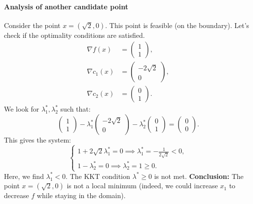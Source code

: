 \paragraph{Analysis of another candidate point}
Consider the point $x = (\sqrt{2}, 0)$. This point is feasible (on the boundary).
Let's check if the optimality conditions are satisfied.
\begin{align*}
    \nabla f(x) &= \begin{pmatrix} 1 \\ 1 \end{pmatrix}, \\
    \nabla c_1(x) &= \begin{pmatrix} -2\sqrt{2} \\ 0 \end{pmatrix}, \\
    \nabla c_2(x) &= \begin{pmatrix} 0 \\ 1 \end{pmatrix}.
\end{align*}
We look for $\lambda_1^*, \lambda_2^*$ such that:
\begin{equation}
    \begin{pmatrix} 1 \\ 1 \end{pmatrix} - \lambda_1^* \begin{pmatrix} -2\sqrt{2} \\ 0 \end{pmatrix} - \lambda_2^* \begin{pmatrix} 0 \\ 1 \end{pmatrix} = \begin{pmatrix} 0 \\ 0 \end{pmatrix}.
\end{equation}
This gives the system:
\begin{equation}
    \begin{cases}
        1 + 2\sqrt{2} \lambda_1^* = 0 \implies \lambda_1^* = -\frac{1}{2\sqrt{2}} < 0, \\
        1 - \lambda_2^* = 0 \implies \lambda_2^* = 1 \ge 0.
    \end{cases}
\end{equation}
Here, we find $\lambda_1^* < 0$. The KKT condition $\lambda^* \ge 0$ is not met.
\textbf{Conclusion:} The point $x = (\sqrt{2}, 0)$ is not a local minimum (indeed, we could increase $x_1$ to decrease $f$ while staying in the domain).

